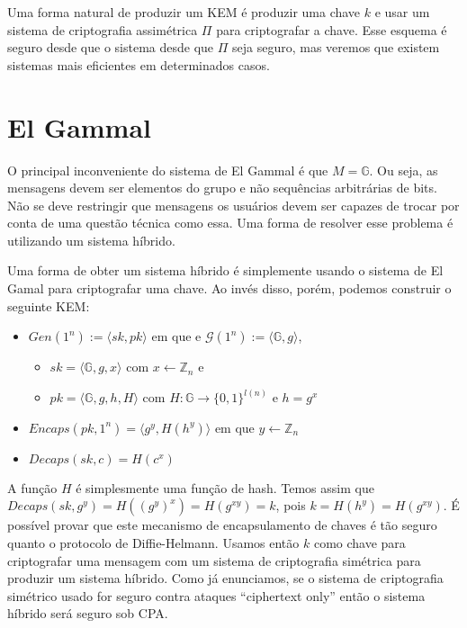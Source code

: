 Uma forma natural de produzir um KEM é produzir uma chave $k$ e usar um sistema de criptografia assimétrica $\Pi$ para criptografar a chave.
Esse esquema é seguro desde que o sistema desde que $\Pi$ seja seguro, mas veremos que existem sistemas mais eficientes em determinados casos.

\section{El Gammal}
\label{sec:el-gammal}

O principal inconveniente do sistema de El Gammal é que $M = \mathbb{G}$.
Ou seja, as mensagens devem ser elementos do grupo e não sequências arbitrárias de bits.
Não se deve restringir que mensagens os usuários devem ser capazes de trocar por conta de uma questão técnica como essa.
Uma forma de resolver esse problema é utilizando um sistema híbrido.

Uma forma de obter um sistema híbrido é simplemente usando o sistema de El Gamal para criptografar uma chave.
Ao invés disso, porém, podemos construir o seguinte KEM:

\begin{itemize}
\item $Gen(1^n) := \langle sk, pk \rangle$ em que e $\mathcal{G}(1^n) := \langle \mathbb{G}, g \rangle$, 
\begin{itemize}
\item $sk = \langle \mathbb{G}, g, x \rangle$ com $x \leftarrow \mathbb{Z}_n$ e
\item $pk = \langle \mathbb{G}, g, h, H \rangle$ com $H: \mathbb{G} \to \{0,1\}^{l(n)}$ e $h = g^x$
\end{itemize}
\item $Encaps(pk, 1^n) = \langle g^y, H(h^y)\rangle$ em que $y \leftarrow \mathbb{Z}_n$
\item $Decaps(sk, c) = H(c^x)$
\end{itemize}

A função $H$ é simplesmente uma função de hash.
Temos assim que $Decaps(sk, g^y) = H((g^y)^x) = H(g^{xy}) = k$, pois $k = H(h^y) = H(g^{xy})$.
É possível provar que este mecanismo de encapsulamento de chaves é tão seguro quanto o protocolo de Diffie-Helmann.
Usamos então $k$ como chave para criptografar uma mensagem com um sistema de criptografia simétrica para produzir um sistema híbrido.
Como já enunciamos, se o sistema de criptografia simétrico usado for seguro contra ataques ``ciphertext only'' então o sistema híbrido será seguro sob CPA.

